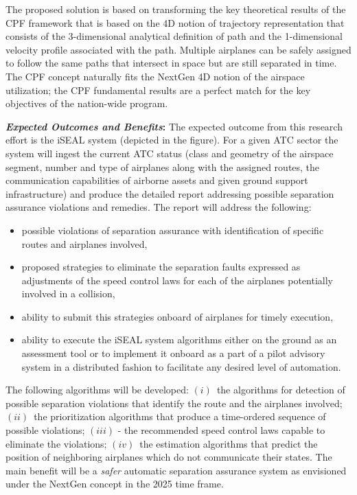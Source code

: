 \documentclass[letter,onecolumn,12pt]{aiaa-tc}
\begin{document}
The proposed solution is based on transforming the key theoretical results of the CPF framework that is based on the 4D notion of trajectory representation that consists of the 3-dimensional analytical definition of path and the 1-dimensional velocity profile associated with the path. Multiple airplanes can be safely assigned to follow the same paths that intersect in space but are still separated in time. The CPF concept naturally fits the NextGen 4D notion of the airspace utilization; the CPF fundamental results are a perfect match for the key objectives of the nation-wide program.

\medskip

\textbf{\emph{Expected Outcomes and Benefits}:} The expected outcome from this research effort is the iSEAL system (depicted in the figure). For a given ATC sector the system will ingest the current ATC status (class and geometry of the airspace segment, number and type of airplanes along with the assigned routes,  the communication capabilities of airborne assets and given ground support infrastructure) and produce the detailed report addressing possible separation assurance violations and remedies. The report will address the following:
\begin{itemize}
    \setlength{\itemsep}{-4pt}
	\item possible violations of separation assurance with identification of specific routes and airplanes involved,
    	\item proposed strategies to eliminate the separation faults expressed as adjustments of the speed control laws for each of the airplanes potentially involved in a collision,
    	\item ability to submit this strategies onboard of airplanes for timely execution,
    	\item ability to execute the iSEAL system algorithms either on the ground as an assessment tool or to implement it onboard as a part of a pilot advisory system in a distributed fashion to facilitate any desired level of automation.
\end {itemize}
        
The following algorithms will be developed: $(i)$~the algorithms for detection of possible separation violations that identify the route and the airplanes involved; $(ii)$~the prioritization algorithms that produce a time-ordered sequence of possible violations; $(iii)$ - the recommended speed control laws capable to eliminate the violations; $(iv)$~the estimation algorithms that predict the position of neighboring airplanes which do not communicate their states. The main benefit will be a \emph{safer} automatic separation assurance system as envisioned under the NextGen concept in the 2025 time frame.
\medskip
\end{document}
